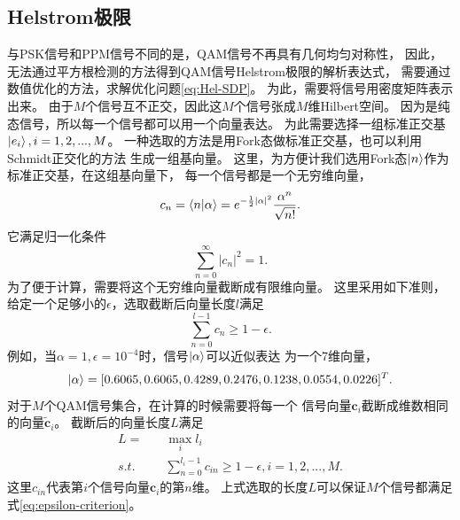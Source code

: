 \subsection{Helstrom极限}
与PSK信号和PPM信号不同的是，QAM信号不再具有几何均匀对称性，
因此，无法通过平方根检测的方法得到QAM信号Helstrom极限的解析表达式，
需要通过数值优化的方法，求解优化问题\ref{eq:Hel-SDP}。
为此，需要将信号用密度矩阵表示出来。
由于$M$个信号互不正交，因此这$M$个信号张成$M$维Hilbert空间。
因为是纯态信号，所以每一个信号都可以用一个向量表达。
为此需要选择一组标准正交基$\ket{e_i}, i=1,2,...,M$。
一种选取的方法是用Fork态做标准正交基，也可以利用Schmidt正交化的方法
生成一组基向量\cite{zxd2004matrix}。
这里，为方便计我们选用Fork态$\ket{n}$作为标准正交基，在这组基向量下，
每一个信号都是一个无穷维向量，
\begin{equation}
c_n = \bra{n}\ket{\alpha} = e^{-\frac{1}{2}|\alpha|^2} \frac{\alpha^n}{\sqrt{n!}}.
\end{equation}
它满足归一化条件
\begin{equation}
\sum_{n=0}^{\infty} |c_n|^2 = 1.
\end{equation}
为了便于计算，需要将这个无穷维向量截断成有限维向量。
这里采用如下准则，给定一个足够小的$\epsilon$，选取截断后向量长度$l$满足
\begin{equation}
\sum_{n=0}^{l-1} c_n \ge 1 - \epsilon.
\label{eq:epsilon-criterion}
\end{equation}
例如，当$\alpha=1, \epsilon=10^{-4}$时，信号$\ket{\alpha}$可以近似表达
为一个7维向量，
\begin{equation}
\ket{\alpha} = [0.6065, \\
    0.6065, \\
    0.4289, \\
    0.2476, \\
    0.1238, \\
    0.0554, \\
    0.0226]^T.
\end{equation}
对于$M$个QAM信号集合，在计算的时候需要将每一个
信号向量$\bm{c}_i$截断成维数相同的向量$\tilde{\bm{c}}_i$。
截断后的向量长度$L$满足
\begin{equation}
\begin{split}
L = \quad  & \max_i l_i  \\
s.t. \quad &\sum_{n=0}^{l_i-1} c_{in} \ge 1 - \epsilon, i=1,2,...,M.
\end{split}
\end{equation}
这里$c_{in}$代表第$i$个信号向量$\bm{c}_i$的第$n$维。
上式选取的长度$L$可以保证$M$个信号都满足式\ref{eq:epsilon-criterion}。

